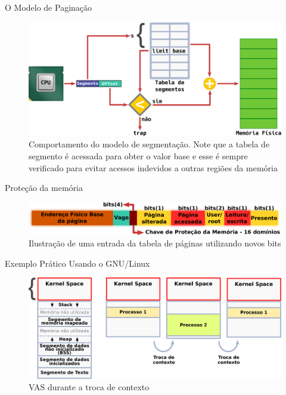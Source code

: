 \documentclass[xcolor={usenames,svgnames,dvipsnames},brazil,english,12pt,aspectratio=149]{beamer}
\begin{document}
\begin{frame}{O Modelo de Paginação}
	\begin{figure}[!h]
		\centering
		\includegraphics[width=.80\textwidth]{segmentacao} 
		\caption{Comportamento do modelo de segmentação. Note que a tabela de segmento é acessada para obter o valor base e esse é sempre verificado para evitar acessos indevidos a outras regiões da memória}
		\label{fig:segmentacao} 
	\end{figure}
\end{frame}

\begin{frame}{Proteção da memória}
	\begin{figure}[!h]
		\centering
		\includegraphics[width=.80\textwidth]{pte_domain} 
		\caption{Ilustração de uma entrada da tabela de páginas utilizando novos bits}
		\label{fig:ptedominio} 
	\end{figure}
\end{frame}

\begin{frame}{Exemplo Prático Usando o GNU/Linux}
	\begin{figure}[!h]
		\centering
		\includegraphics[width=\textwidth]{segmento_troca_contexto}
		\caption{VAS durante a troca de contexto}
		\label{fig:vas_contexto}
	\end{figure}
\end{frame}
\end{document}
